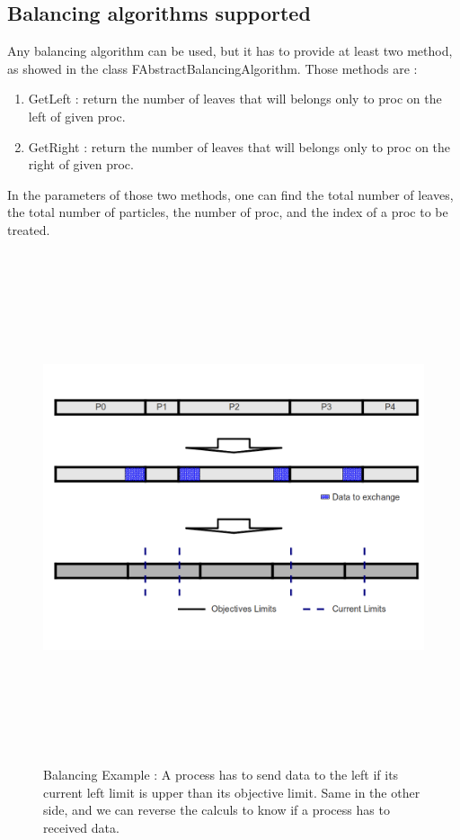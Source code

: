 \documentclass[12pt,letterpaper,titlepage]{report}
\begin{document}
\subsection{Balancing algorithms supported}
Any balancing algorithm can be used, but it has to provide at least
two method, as showed in the class FAbstractBalancingAlgorithm.
Those methods are :
\begin{enumerate}
\item GetLeft : return the number of leaves that will belongs only to
  proc on the left of given proc.
\item GetRight : return the number of leaves that will belongs only to
  proc on the right of given proc.
\end{enumerate}

In the parameters of those two methods, one can find the total number
of leaves, the total number of particles, the number of proc, and the
index of a proc to be treated.

\begin{figure}[h!]
  \begin{center}
    \includegraphics[width=15cm, height=15cm, keepaspectratio=true]{Images/Balance.png}
    \caption{Balancing Example : A process has to send data to the
      left if its current left limit is upper than its objective
      limit.  Same in the other side, and we can reverse the calculs
      to know if a process has to received data.}
  \end{center}
\end{figure}
\end{document}
